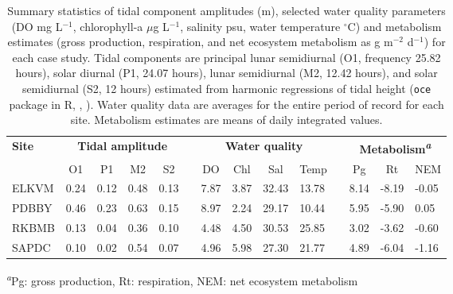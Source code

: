 \documentclass[letterpaper,12pt,oneside]{article}\usepackage[]{graphicx}\usepackage[]{color}
\begin{document}
\begin{table}[!tbp]
\caption{Summary statistics of tidal component amplitudes (m), selected water quality parameters (\ac{DO} mg L$^{-1}$, chlorophyll-a $\mu$g L$^{-1}$, salinity psu, water temperature $^{\circ}$C)  and metabolism estimates (gross production, respiration, and net ecosystem metabolism as g m$^{-2}$ d$^{-1}$) for each case study.  Tidal components are principal lunar semidiurnal (O1, frequency 25.82 hours), solar diurnal (P1, 24.07 hours), lunar semidiurnal (M2, 12.42 hours), and solar semidiurnal (S2, 12 hours) estimated from harmonic regressions of tidal height (\texttt{oce} package in R, \citealt{Foreman89}, ).  Water quality data are averages for the entire period of record for each site.  Metabolism estimates are means of daily integrated values.\label{tab:case_att}} 
\begin{center}
\begin{tabular}{lllllcllllclll}
\hline\hline
\multicolumn{1}{l}{\bfseries Site}&\multicolumn{4}{c}{\bfseries Tidal amplitude}&\multicolumn{1}{c}{\bfseries }&\multicolumn{4}{c}{\bfseries Water quality}&\multicolumn{1}{c}{\bfseries }&\multicolumn{3}{c}{\bfseries Metabolism\textsuperscript{\textit{a}}}\tabularnewline
\cline{2-5} \cline{7-10} \cline{12-14}
\multicolumn{1}{l}{}&\multicolumn{1}{c}{O1}&\multicolumn{1}{c}{P1}&\multicolumn{1}{c}{M2}&\multicolumn{1}{c}{S2}&\multicolumn{1}{c}{}&\multicolumn{1}{c}{DO}&\multicolumn{1}{c}{Chl}&\multicolumn{1}{c}{Sal}&\multicolumn{1}{c}{Temp}&\multicolumn{1}{c}{}&\multicolumn{1}{c}{Pg}&\multicolumn{1}{c}{Rt}&\multicolumn{1}{c}{NEM}\tabularnewline
\hline
ELKVM&0.24&0.12&0.48&0.13&&7.87&3.87&32.43&13.78&&8.14&-8.19&-0.05\tabularnewline
PDBBY&0.46&0.23&0.63&0.15&&8.97&2.24&29.17&10.44&&5.95&-5.90& 0.05\tabularnewline
RKBMB&0.13&0.04&0.36&0.10&&4.48&4.50&30.53&25.85&&3.02&-3.62&-0.60\tabularnewline
SAPDC&0.10&0.02&0.54&0.07&&4.96&5.98&27.30&21.77&&4.89&-6.04&-1.16\tabularnewline
\hline
\end{tabular}\end{center}

\footnotesize\textsuperscript{\textit{a}}Pg: gross production, Rt: respiration, NEM: net ecosystem metabolism\end{table}
\end{document}
